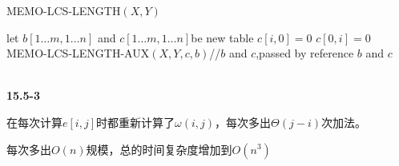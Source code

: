 \documentclass[UTF8]{ctexart}
\begin{document}
\begin{algorithm}
    \caption[]{MEMO-LCS-LENGTH$(X,Y)$}
    \label{alg:3}
    \begin{algorithmic}[1]
        \STATE let $b[1\dots m,1\dots n]$ and $c[1\dots m,1\dots n]$be new table
            \STATE $c[i,0]=0$
        \ENDFOR
            \STATE $c[0,i]=0$
        \ENDFOR
        \STATE MEMO-LCS-LENGTH-AUX$(X,Y,c,b)$//$b$ and $c$,passed by reference
        \RETURN $b$ and $c$
    \end{algorithmic}
\end{algorithm}

~\\
\noindent\textbf{15.5-3}

在每次计算$e[i,j]$时都重新计算了$\omega(i,j)$，每次多出$\Theta(j-i)$次加法。

每次多出$O(n)$规模，总的时间复杂度增加到$O(n^3)$
\end{document}
